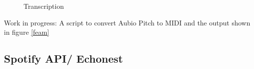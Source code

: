 \begin{figure}[htbp]
	\centering
	\caption{Transcription}
	\label{fig:transc}
\end{figure}
\FloatBarrier

Work in progress: A script to convert Aubio Pitch to MIDI and the output shown in figure \ref{feam}

\subsection{Spotify API/ Echonest}\label{spotipy}

